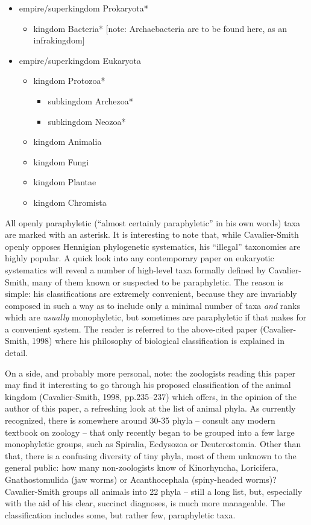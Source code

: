 \begin{artengenv}
\begin{itemize}
\item empire/superkingdom Prokaryota*

\begin{itemize}
\item kingdom Bacteria* [note: Archaebacteria are to be found here, as an infrakingdom]
\end{itemize}
\item empire/superkingdom Eukaryota

\begin{itemize}
\item kingdom Protozoa*

\begin{itemize}
\item subkingdom Archezoa*
\item subkingdom Neozoa*
\end{itemize}
\item kingdom Animalia
\item kingdom Fungi
\item kingdom Plantae
\item kingdom Chromista
\end{itemize}
\end{itemize}
All openly paraphyletic (“almost certainly paraphyletic” in his own words) taxa are marked with an asterisk. It is
interesting to note that, while Cavalier-Smith openly opposes Hennigian phylogenetic systematics, his “illegal”
taxonomies are highly popular. A quick look into any contemporary paper on eukaryotic systematics will reveal a number
of high-level taxa formally defined by Cavalier-Smith, many of them known or suspected to be paraphyletic. The reason
is simple: his classifications are extremely convenient, because they are invariably composed in such a way as to
include only a minimal number of taxa \textit{and} ranks which are \textit{usually }monophyletic, but sometimes are
paraphyletic if that makes for a convenient system. The reader is referred to the above-cited paper (Cavalier-Smith,
1998) where his philosophy of biological classification is explained in detail.

On a side, and probably more personal, note: the zoologists reading this paper may find it interesting to go through his
proposed classification of the animal kingdom \label{ref:RNDayLTgHPurs}(Cavalier-Smith, 1998, pp.235–237) which offers,
in the opinion of the author of this paper, a refreshing look at the list of animal phyla. As currently recognized,
there is somewhere around 30-35 phyla – consult any modern textbook on zoology – that only recently began to be grouped
into a few large monophyletic groups, such as Spiralia, Ecdysozoa or Deuterostomia. Other than that, there is a
confusing diversity of tiny phyla, most of them unknown to the general public: how many non-zoologists know of
Kinorhyncha, Loricifera, Gnathostomulida (jaw worms) or Acanthocephala (spiny-headed worms)? Cavalier-Smith groups all
animals into 22 phyla – still a long list, but, especially with the aid of his clear, succinct diagnoses, is much more
manageable. The classification includes some, but rather few, paraphyletic taxa.


\end{artengenv}
